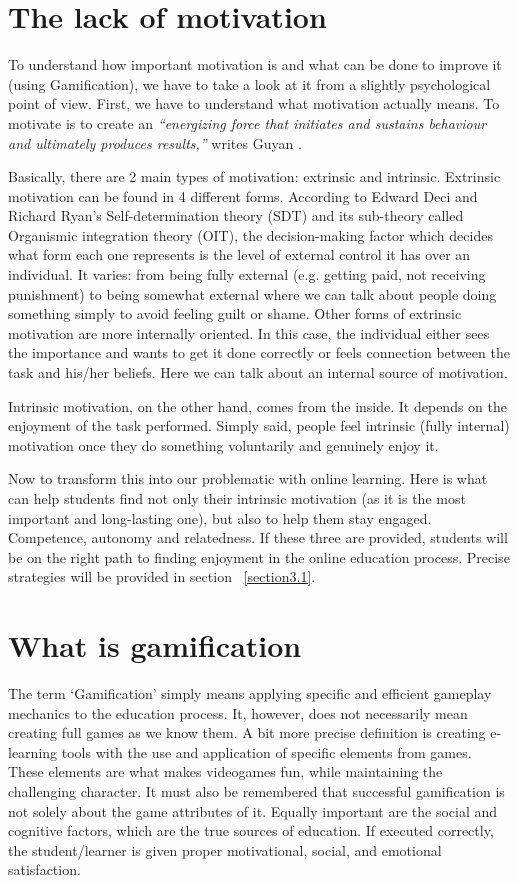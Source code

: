\documentclass[10pt,english,a4paper]{article}
\begin{document}
\section{The lack of motivation} \label{section2}
	To understand how important motivation is and what can be done to improve it (using Gamification), we have to take a look at it from a slightly psychological point of view. First, we have to understand what motivation actually means. 
	To motivate is to create an \textit{“energizing force that initiates and sustains behaviour and ultimately produces results,”} writes Guyan \cite{Guyan}. 

	Basically, there are 2 main types of motivation: extrinsic and intrinsic. Extrinsic motivation can be found in 4 different forms. 
	According to Edward Deci and Richard Ryan's Self-determination theory (SDT) and its sub-theory called Organismic integration theory (OIT), the decision-making factor which decides what form each one represents is the level of external control it has over an individual. 
	It varies: from being fully external (e.g. getting paid, not receiving punishment) to being somewhat external where we can talk about people doing something simply to avoid feeling guilt or shame. Other forms of extrinsic motivation are more internally oriented. 
	In this case, the individual either sees the importance and wants to get it done correctly or feels connection between the task and his/her beliefs. Here we can talk about an internal source of motivation.
	
	Intrinsic motivation, on the other hand, comes from the inside. It depends on the enjoyment of the task performed. Simply said, people feel intrinsic (fully internal) motivation once they do something voluntarily and genuinely enjoy it.

	Now to transform this into our problematic with online learning. Here is what can help students find not only their intrinsic motivation (as it is the most important and long-lasting one), but also to help them stay engaged. 
	Competence, autonomy and relatedness. If these three are provided, students will be on the right path to finding enjoyment in the online education process.\cite{Guyan} Precise strategies will be provided in section ~\ref{section3.1}.

\section{What is gamification} \label{section3}
	The term ‘Gamification’ simply means applying specific and efficient gameplay mechanics to the education process. It, however, does not necessarily mean creating full games as we know them.\cite{Raymer}
	A bit more precise definition is creating e-learning tools with the use and application of specific elements from games. These elements are what makes videogames fun, while maintaining the challenging character.\cite{Abu-Dawood} 
	It must also be remembered that successful gamification is not solely about the game attributes of it. Equally important are the social and cognitive factors, which are the true sources of education. \cite{Raymer}
	If executed correctly, the student/learner is given proper motivational, social, and emotional satisfaction.\cite{Abu-Dawood} 
\end{document}
